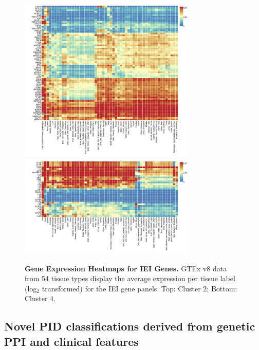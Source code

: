 \begin{figure}[ht]
\centering
\includegraphics[width=0.75\textwidth]{../images/expHeat_FUMA_jobs604419_var_risk_est_cluster_2.png}
\includegraphics[width=0.75\textwidth]{../images/expHeat_FUMA_jobs604403_var_risk_est_cluster_4.png}
\caption{\textbf{Gene Expression Heatmaps for IEI Genes.} GTEx v8 data from 54 tissue types display the average expression per tissue label (log\(_2\) transformed) for the IEI gene panels. Top: Cluster 2; Bottom: Cluster 4.}
\label{fig:expHeatmaps}
\end{figure}





\FloatBarrier
\clearpage
\subsection{Novel PID classifications derived from genetic PPI and clinical features}

